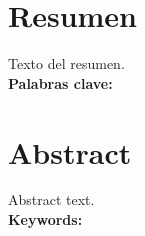 \newpage
\thispagestyle{empty}
\chapter*{\sffamily Resumen}
%
\begin{center}
\textbf{\large \thesisname}
\end{center}
\par Texto del resumen.
\\[2cm]
\textbf{Palabras clave:} \palabrasclave
\newpage
\thispagestyle{empty}
\chapter*{\sffamily Abstract}
%
\begin{center}
\textbf{\large \thesisnameeng}
\end{center}
\par Abstract text.
\\[2cm]
\textbf{Keywords:} \keywords

